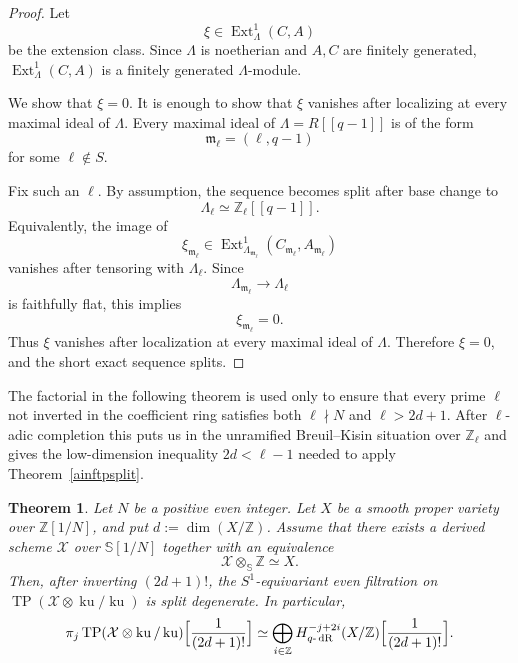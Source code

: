 \documentclass[11pt]{amsart}
\newtheorem{theorem}[lemma]{Theorem}
\numberwithin{equation}{section}
\newcommand{\Z}{\mathbb{Z}}
\newcommand{\mf}{\mathfrak}
\newcommand{\qdR}{q\text{-}\operatorname{{dR}}}
\numberwithin{equation}{section}
\newcommand{\TP}{\operatorname{TP}}
\newcommand{\ku}{\operatorname{ku}}
\newcommand{\bS}{\mathbb{S}}
\begin{document}
\begin{proof}
Let
\[
  \xi\in \operatorname{Ext}^1_\Lambda(C,A)
\]
be the extension class. Since $\Lambda$ is noetherian and $A,C$ are
finitely generated, $\operatorname{Ext}^1_\Lambda(C,A)$ is a finitely
generated $\Lambda$-module.

We show that $\xi=0$. It is enough to show that $\xi$ vanishes after
localizing at every maximal ideal of $\Lambda$. Every maximal ideal of
$\Lambda=R[[q-1]]$ is of the form
\[
  \mf{m}_\ell=(\ell,q-1)
\]
for some $\ell\notin S$.

Fix such an $\ell$. By assumption, the sequence becomes split after base
change to
\[
  \Lambda_\ell\simeq \Z_\ell[[q-1]].
\]
Equivalently, the image of
\[
  \xi_{\mf{m}_\ell}
  \in
  \operatorname{Ext}^1_{\Lambda_{\mf{m}_\ell}}
  (C_{\mf{m}_\ell},A_{\mf{m}_\ell})
\]
vanishes after tensoring with $\Lambda_\ell$. Since
\[
  \Lambda_{\mf{m}_\ell}\to \Lambda_\ell
\]
is faithfully flat, this implies
\[
  \xi_{\mf{m}_\ell}=0.
\]
Thus $\xi$ vanishes after localization at every maximal ideal of $\Lambda$.
Therefore $\xi=0$, and the short exact sequence splits.
\end{proof}

The factorial in the following theorem is used only to ensure that every prime
$\ell$ not inverted in the coefficient ring satisfies both $\ell\nmid N$ and
$\ell>2d+1$.  After $\ell$-adic completion this puts us in the unramified
Breuil--Kisin situation over $\Z_\ell$ and gives the low-dimension
inequality $2d<\ell-1$ needed to apply Theorem~\ref{ainftpsplit}.

\begin{theorem}\label{qtpsplit}
Let $N$ be a positive even integer. Let $X$ be a smooth proper variety over $\Z[1/N]$, and put $d:=\dim(X/\Z)$. Assume that there exists a derived scheme $\mathcal X$ over $\bS[1/N]$ together with an equivalence
\[
  \mathcal X\otimes_{\bS}\Z\simeq X.
\]
Then, after inverting $(2d+1)!$, the $S^1$-equivariant even filtration on $\TP(\mathcal X\otimes\ku/\ku)$ is split degenerate. In particular,
\[
  \pi_j\TP(\mathcal X\otimes\ku/\ku)\Bigl[\frac{1}{(2d+1)!}\Bigr]
  \simeq
  \bigoplus_{i\in\Z}H_{\qdR}^{-j+2i}(X/\Z)\Bigl[\frac{1}{(2d+1)!}\Bigr].
\]
\end{theorem}
\end{document}
